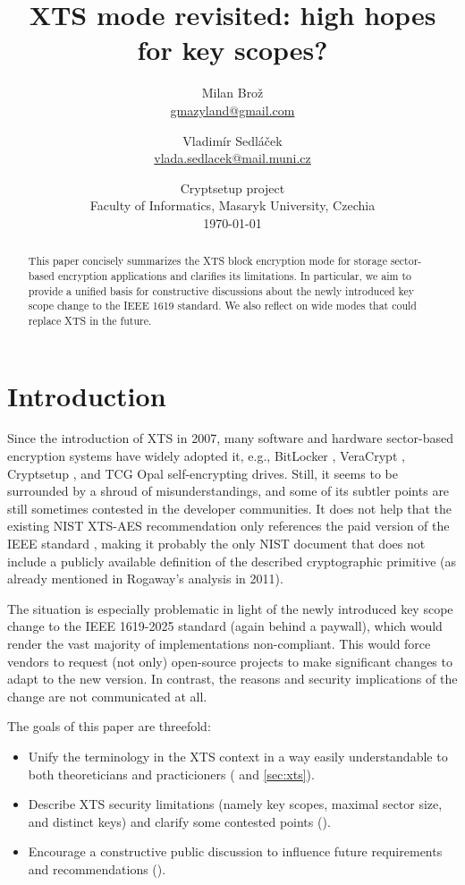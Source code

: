 \documentclass[a4paper]{article}
\title{XTS mode revisited: high hopes for key scopes?}
\author{
Milan Brož\inst{1,2} \\ \normalsize\href{mailto:gmazyland@gmail.com}{gmazyland@gmail.com}
\and
Vladimír Sedláček\inst{2} \\ \normalsize\href{mailto:vlada.sedlacek@mail.muni.cz}{vlada.sedlacek@mail.muni.cz}
}
\date{
\vspace{0.5pt}
\normalsize\inst{1}Cryptsetup project \\
\normalsize\inst{2}Faculty of Informatics, Masaryk University, Czechia \\
\vspace{5pt}
\normalsize\today
}
\begin{document}
\maketitle

\begin{abstract}
This paper concisely summarizes the XTS block encryption mode for storage sector-based encryption applications and clarifies its limitations. In particular, we aim to provide a unified basis for constructive discussions about the newly introduced key scope change to the IEEE 1619 standard.  We also reflect on wide modes that could replace XTS in the future.
\end{abstract}

\begin{center}
\doclicenseText
\end{center}

\section{Introduction}

Since the introduction of XTS \cite{IEEE1619-2018} in 2007, many software and hardware sector-based encryption systems have widely adopted it, e.g., BitLocker \cite{bitlocker}, VeraCrypt \cite{veracrypt}, Cryptsetup \cite{cryptsetup}, and TCG Opal \cite{tcgopal} self-encrypting drives. Still, it seems to be surrounded by a shroud of misunderstandings, and some of its subtler points are still sometimes contested in the developer communities. It does not help that the existing NIST XTS-AES recommendation \cite{nistxts} only references the paid version of the IEEE standard \cite{IEEE1619-2018}, making it probably the only NIST document that does not include a publicly available definition of the described cryptographic primitive (as already mentioned in Rogaway's analysis \cite{rogaway2011evaluation} in 2011).

The situation is especially problematic in light of the newly introduced key scope change to the IEEE 1619-2025 standard \cite{IEEE1619-2025} (again behind a paywall), which would render the vast majority of implementations non-compliant. This would force vendors to request (not only) open-source projects to make significant changes to adapt to the new version. In contrast, the reasons and security implications of the change are not communicated at all.

The goals of this paper are threefold:
\begin{itemize}
    \item Unify the terminology in the XTS context in a way easily understandable to both theoreticians and practicioners ( and \ref{sec:xts}).
    \item Describe XTS security limitations (namely key scopes, maximal sector size, and distinct keys) and clarify some contested points ().
    \item Encourage a constructive public discussion to influence future requirements and recommendations ().
\end{itemize}
\end{document}
